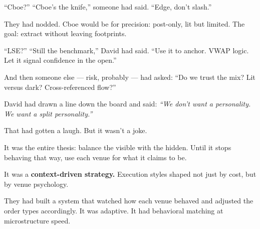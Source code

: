 ``Cboe?''
``Cboe’s the knife,'' someone had said. ``Edge, don’t slash.''

They had nodded. Cboe would be for precision: post-only, lit but limited.
The goal: extract without leaving footprints.

``LSE?''
``Still the benchmark,'' David had said. ``Use it to anchor. VWAP logic. Let it signal 
confidence in the open.''

And then someone else --- risk, probably --- had asked:
``Do we trust the mix? Lit versus dark? Cross-referenced flow?''

David had drawn a line down the board and said:
\textit{``We don’t want a personality. We want a split personality.''}

That had gotten a laugh. But it wasn’t a joke.

It was the entire thesis: balance the visible with the hidden.
Until it stops behaving that way, use each venue for what it claims to be.

\medskip

\renewcommand{\arraystretch}{1.4}  %

\begin{table}[H]
\centering
{}
\caption{Mapping of Venues to Execution Styles, Behaviors, and Risk Profiles}
\end{table}

\medskip

It was a \textbf{context-driven strategy.}
Execution styles shaped not just by cost, but by venue psychology.

They had built a system that watched how each venue behaved
and adjusted the order types accordingly.
It was adaptive. It had behavioral matching at microstructure speed.

